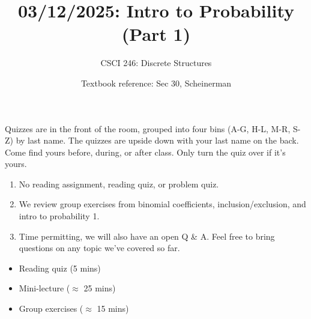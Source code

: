 \documentclass[10pt]{beamer}
\begin{document}





%
\title{03/12/2025: Intro to Probability (Part 1)}
\author{CSCI 246: Discrete Structures}
\date{Textbook reference: Sec 30, Scheinerman}

\begin{frame}
    \titlepage 
\end{frame}


\begin{frame}
\footnotesize 
\begin{mygreenbox}[title=Graded Quiz Pickup]
Quizzes are in the front of the room, grouped into four bins (A-G, H-L, M-R, S-Z) by last name. The quizzes are upside down with your last name on the back. Come find yours before, during, or after class.  Only turn the quiz over if it's yours.
\end{mygreenbox} 
\vfill 

\begin{myredbox}[title=Announcement: Friday 03/14 will be a review day]
\begin{enumerate}
	\item No reading assignment,  reading quiz, or problem quiz. 
	\item We review group exercises from binomial coefficients, inclusion/exclusion, and intro to probability 1.
	\item Time permitting, we will also have an open Q \& A.  Feel free to bring questions on any topic we've covered so far.
\end{enumerate}
\end{myredbox}

\vfill 


\begin{myyellowbox}[title=Today's Agenda]
\begin{itemize}
	\item Reading quiz (5 mins)
	\item Mini-lecture ($\approx$ 25 mins)
	\item Group exercises ($\approx$ 15 mins)
\end{itemize}

%	
\end{myyellowbox}
\vfill 

\end{frame}
\end{document}
